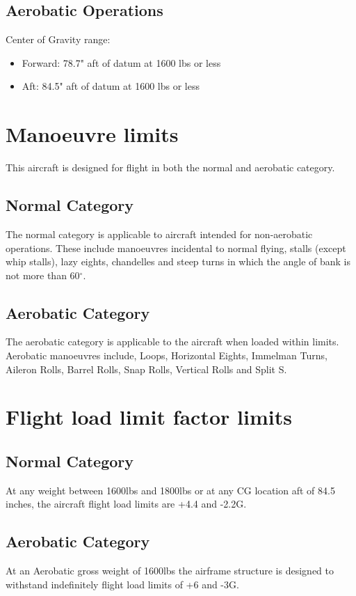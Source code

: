 \subsection{Aerobatic Operations}
Center of Gravity range:
\begin{itemize}
\item{Forward:} 78.7" aft of datum at 1600 lbs or less
\item{Aft:} 84.5" aft of datum at 1600 lbs or less
\end{itemize}

\section{Manoeuvre limits}
This aircraft is designed for flight in both the normal and aerobatic category.
\subsection{Normal Category}
The normal category is applicable to aircraft intended for non-aerobatic operations.  These include manoeuvres incidental to normal flying, stalls (except whip stalls), lazy eights, chandelles and steep turns in which the angle of bank is not more than 60$^{\circ}$.

\subsection{Aerobatic Category}
The aerobatic category is applicable to the aircraft when loaded within limits.  Aerobatic manoeuvres include, Loops, Horizontal Eights, Immelman Turns, Aileron Rolls, Barrel Rolls, Snap Rolls, Vertical Rolls and Split S.

\section{Flight load limit factor limits}
\subsection{Normal Category}
At any weight between 1600lbs and 1800lbs or at any CG location aft of 84.5 inches, the aircraft flight load limits are +4.4 and -2.2G.

\subsection{Aerobatic Category}
At an Aerobatic gross weight of 1600lbs the airframe structure is designed to withstand indefinitely flight load limits of +6 and -3G.  

